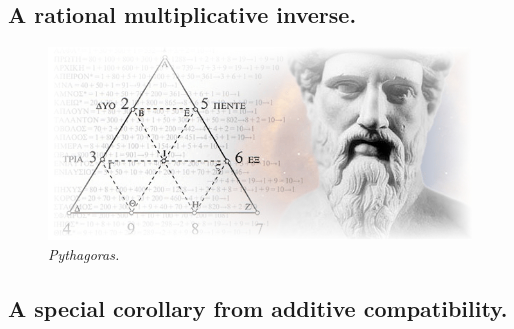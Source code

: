 \documentclass[preview]{standalone}
\begin{document}
\subsection{A rational multiplicative inverse.}

\begin{figure}[h!]
    \centering
    \includegraphics[width=13cm]{../resources/jpg/1.6.introduction.to.proofs/pythagoras.jpg}
    \caption*{\emph{Pythagoras.}}
\end{figure}


\subsection{A special corollary from additive compatibility.}

\pagebreak


\end{document}
